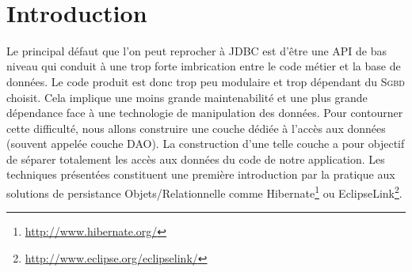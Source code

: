 \documentclass[a4paper,11pt]{article}
\date{}
\begin{document}

\newlength{\niveauZero}
\newlength{\niveauUn}
\newlength{\niveauDeux}
\newlength{\niveauTrois}
\newlength{\niveauQuatre}
\newlength{\niveauCinq}

\newlength{\colonneZero}
\newlength{\colonneUn}
\newlength{\colonneDeux}
\newlength{\colonneTrois}
\newlength{\colonneQuatre}
\newlength{\colonneCinq}


{\centering
    \mbox{
    }
}\\[0.4cm]
\section{Introduction}

Le principal défaut que l'on peut reprocher à JDBC est d'être une API de bas niveau qui conduit à une trop forte 
imbrication entre le code métier et la base de données. Le code produit est donc trop peu modulaire et 
trop dépendant du \textsc{Sgbd} choisit. Cela implique une moins grande maintenabilité et une plus grande 
dépendance face à une technologie de manipulation des données. Pour contourner cette difficulté, nous allons construire 
une couche dédiée à l'accès aux données  (souvent appelée couche DAO). La construction d'une telle couche a pour objectif de séparer totalement 
les accès aux données du code de notre application. Les techniques présentées constituent une première introduction par 
la pratique aux solutions de persistance Objets/Relationnelle comme Hibernate\footnote{\url{http://www.hibernate.org/}} 
ou EclipseLink\footnote{\url{http://www.eclipse.org/eclipselink/}}.
\end{document}
